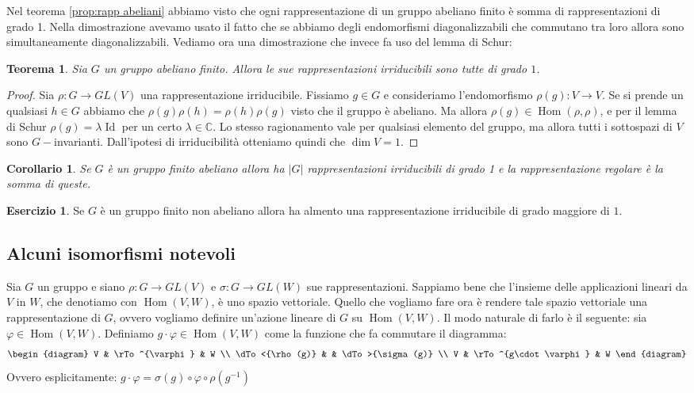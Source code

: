 \documentclass[11pt]{article}
\theoremstyle{plain}
\newtheorem{thm}{Teorema}[section]
\newtheorem*{cor}{Corollario}
\theoremstyle{definition}
\newtheorem{exercise}{Esercizio}[section]
\theoremstyle{remark}
\newcommand{\C}{\mathbb{C}}
\DeclareMathOperator{\Hom}{Hom}
\DeclareMathOperator{\Id}{Id}
\newcommand{\quaddiag}[8]{
	\begin{diagram}
	#1     & \rTo^{#2} & #3 \\
	\dTo<{#6} &         & \dTo>{#4} \\
	#7     & \rTo^{#8} & #5
	\end{diagram}
}
\begin{document}
Nel teorema \ref{prop:rapp abeliani} abbiamo visto che ogni rappresentazione di un gruppo abeliano finito è somma di rappresentazioni di grado 1.
Nella dimostrazione avevamo usato il fatto che se abbiamo degli endomorfismi diagonalizzabili che commutano tra loro allora sono 
simultaneamente diagonalizzabili. Vediamo ora una dimostrazione che invece fa uso del lemma di Schur:
\begin{thm}
Sia $G$ un gruppo abeliano finito. Allora le sue rappresentazioni irriducibili sono tutte di grado $1$.
\end{thm}
\begin{proof}
Sia $\rho:G\to GL(V)$ una rappresentazione irriducibile. Fissiamo $g\in G$ e consideriamo l'endomorfismo $\rho(g):V\to V$.
Se si prende un qualsiasi $h\in G$ abbiamo che $\rho(g)\rho(h) = \rho(h)\rho(g)$ visto che il gruppo è abeliano.
Ma allora $\rho(g)\in\Hom(\rho,\rho)$, e per il lemma di Schur $\rho(g) = \lambda\Id$ per un certo $\lambda\in\C$.
Lo stesso ragionamento vale per qualsiasi elemento del gruppo, ma allora tutti i sottospazi di $V$ sono $G-$invarianti.
Dall'ipotesi di irriducibilità otteniamo quindi che $\dim V = 1$.
\end{proof}

\begin{cor}
Se $G$ è un gruppo finito abeliano allora ha $|G|$ rappresentazioni irriducibili di grado 1 e la rappresentazione regolare è la somma di queste.
\end{cor}

\begin{exercise}
Se $G$ è un gruppo finito non abeliano allora ha almento una rappresentazione irriducibile di grado maggiore di $1$.
\end{exercise}


\subsection{Alcuni isomorfismi notevoli}
Sia $G$ un gruppo e siano $\rho:G\to GL(V)$ e $\sigma:G\to GL(W)$ sue rappresentazioni.
Sappiamo bene che l'insieme delle applicazioni lineari da $V$ in $W$,
che denotiamo con $\Hom(V, W)$, è uno spazio vettoriale.
Quello che vogliamo fare ora è rendere tale spazio vettoriale una rappresentazione di $G$,
ovvero vogliamo definire un'azione lineare di $G$ su $\Hom(V, W)$.
Il modo naturale di farlo è il seguente:
sia $\varphi\in\Hom(V, W)$. Definiamo $g\cdot \varphi\in\Hom(V, W)$ come la funzione che fa commutare il diagramma:
\[ \quaddiag V \varphi W {\sigma(g)} W {\rho(g)} V {g\cdot \varphi} \]
Ovvero esplicitamente: $g\cdot\varphi = \sigma(g) \circ \varphi\circ \rho(g^{-1})$
\end{document}
